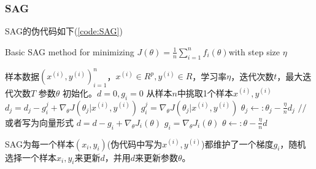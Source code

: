         \subsubsection{SAG}
            \par
            SAG的伪代码如下(\ref{code:SAG})
            \begin{algorithm}[h]
                \caption{Basic SAG method for minimizing $J(\theta) = \frac 1n \sum_{i = 1}^nf_i(\theta)$with step size $\eta$}\label{code:SAG}
                \begin{algorithmic}[1]
                    \Require 样本数据$(x^{(i)},y^{(i)})_{i=1}^n$，$x^{(i)}\in R^p,y^{(i)}\in R$，学习率$\eta$，迭代次数$t$，最大迭代次数$T$
                    \Ensure 参数$\theta$
                    \State 初始化。$d= 0,g_i = 0$
                      \State 从样本$n$中挑取1个样本$x^{(i)},y^{(i)}$
                        \State $d_j = d_j - g_i^j + \nabla _\theta J(\theta_j|x^{(i)},y^{(i)})$
                        \State $g_i^j = \nabla _\theta J(\theta_j|x^{(i)},y^{(i)})$
                        \State $\theta_j \leftarrow:\theta_j - \frac{\eta}{n} d_j$
                      \EndFor
                      \State $//$ 或者写为向量形式
                      \State $d = d - g_i + \nabla _\theta J_i(\theta)$
                      \State $g_i = \nabla_\theta J_i(\theta)$
                      \State $\theta \leftarrow :\theta - \frac{\eta}{n}d$
                    \EndFor
                \end{algorithmic}
            \end{algorithm}
            \par
            SAG为每一个样本$(x_i,y_i)$(伪代码中写为$x^{(i)},y^{(i)}$)都维护了一个梯度$g_i$，随机选择一个样本$x_i,y_i$来更新$d$，并用$d$来更新参数$\theta$。
